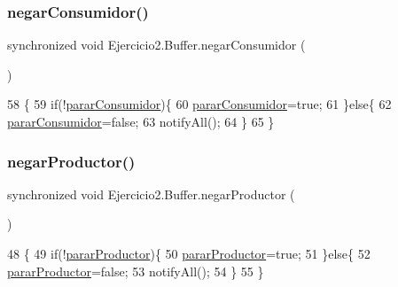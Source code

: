 \subsubsection{\texorpdfstring{negar\+Consumidor()}{negarConsumidor()}}
{\footnotesize\ttfamily synchronized void Ejercicio2.\+Buffer.\+negar\+Consumidor (\begin{DoxyParamCaption}{ }\end{DoxyParamCaption})\hspace{0.3cm}{\ttfamily [inline]}}


\begin{DoxyCode}
58     \{
59         \textcolor{keywordflow}{if}(!\mbox{\hyperlink{class_ejercicio2_1_1_buffer_ace8c2a56a3fa5d45cf9e3d979c5f9d17}{pararConsumidor}})\{
60             \mbox{\hyperlink{class_ejercicio2_1_1_buffer_ace8c2a56a3fa5d45cf9e3d979c5f9d17}{pararConsumidor}}=\textcolor{keyword}{true};
61         \}\textcolor{keywordflow}{else}\{
62             \mbox{\hyperlink{class_ejercicio2_1_1_buffer_ace8c2a56a3fa5d45cf9e3d979c5f9d17}{pararConsumidor}}=\textcolor{keyword}{false};
63             notifyAll();
64         \}
65     \}
\end{DoxyCode}
\mbox{\label{class_ejercicio2_1_1_buffer_ac99f2fdd7322cc95e1fa807cc7b60476}} 
\subsubsection{\texorpdfstring{negar\+Productor()}{negarProductor()}}
{\footnotesize\ttfamily synchronized void Ejercicio2.\+Buffer.\+negar\+Productor (\begin{DoxyParamCaption}{ }\end{DoxyParamCaption})\hspace{0.3cm}{\ttfamily [inline]}}


\begin{DoxyCode}
48     \{
49         \textcolor{keywordflow}{if}(!\mbox{\hyperlink{class_ejercicio2_1_1_buffer_a519b556e9529e75803b99114dbdd0eab}{pararProductor}})\{
50             \mbox{\hyperlink{class_ejercicio2_1_1_buffer_a519b556e9529e75803b99114dbdd0eab}{pararProductor}}=\textcolor{keyword}{true};
51         \}\textcolor{keywordflow}{else}\{
52             \mbox{\hyperlink{class_ejercicio2_1_1_buffer_a519b556e9529e75803b99114dbdd0eab}{pararProductor}}=\textcolor{keyword}{false};
53             notifyAll();
54         \}
55     \}
\end{DoxyCode}
\mbox{\label{class_ejercicio2_1_1_buffer_a3e868b19d6ff03945998803e3384615c}} 
